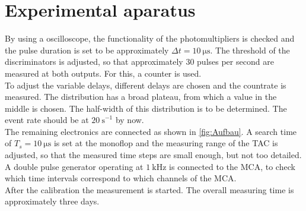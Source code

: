 \chapter{Experimental aparatus}
\label{cha:Durchführung}

By using a oscilloscope, the functionality of the photomultipliers is checked and the pulse duration is set to be approximately $\Delta t = \qty{10}{\micro\second}$. The threshold of the discriminators
is adjusted, so that approximately 30 pulses per second are measured at both outputs. For this, a counter is used.\\
To adjust the variable delays, different delays are chosen and the countrate is measured. The distribution has a broad plateau, from which a value
in the middle is chosen. The half-width of this distribution is to be determined. The event rate should be at $\qty{20}{\second}^{-1}$ by now.\\
The remaining electronics are connected as shown in \autoref{fig:Aufbau}. A search time of $T_s = \qty{10}{\micro\second}$ is set at the monoflop
and the measuring range of the TAC is adjusted, so that the measured time steps are small enough, but not too detailed.\\
A double pulse generator operating at $\qty{1}{\kilo\hertz}$ is connected to the MCA, to check which time intervals correspond to which channels of the
MCA. \\
After the calibration the measurement is started. The overall measuring time is approximately three days.